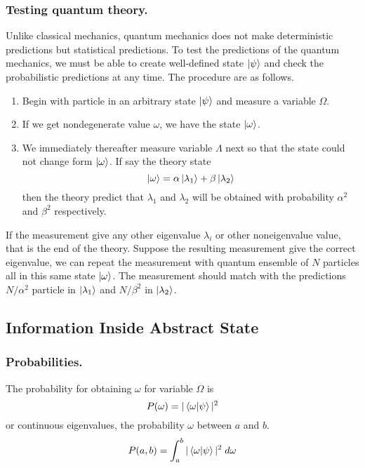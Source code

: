 \documentclass[../../../main.tex]{subfiles}
\begin{document}
\subsubsection{Testing quantum theory.}
Unlike classical mechanics, quantum mechanics does not make deterministic predictions but statistical predictions.
To test the predictions of the quantum mechanics, we must be able to create well-defined state $\ket{\psi}$ and check the probabilistic predictions at any time.
The procedure are as follows.
\begin{enumerate}
    \item Begin with particle in an arbitrary state $\ket{\psi}$ and measure a variable $\Omega$.
    \item If we get nondegenerate value $\omega$, we have the state $\ket{\omega}$.
    \item We immediately thereafter measure variable $\Lambda$ next so that the state could not change form $\ket{\omega}$.
    If say the theory state 
    \begin{equation*}
        \ket{\omega}=\alpha \ket{\lambda_1}+\beta \ket{\lambda_2}
    \end{equation*}
    then the theory predict that $\lambda_1$ and $\lambda_2$ will be obtained with probability $\alpha^2$ and $\beta^2$ respectively.
\end{enumerate}
If the measurement give any other eigenvalue $\lambda_i$ or other noneigenvalue value, that is the end of the theory.
Suppose the resulting measurement give the correct eigenvalue, we can repeat the measurement with quantum ensemble of $N$ particles all in this same state $\ket{\omega}$.
The measurement should match with the predictions $N/\alpha^2$ particle in $\ket{\lambda_1}$ and $N/\beta^2$ in $\ket{\lambda_2}$.

\subsection{Information Inside Abstract State}
\subsubsection{Probabilities.}
The probability for obtaining $\omega$ for variable $\Omega$ is 
\begin{equation*}
    P(\omega)=|\braket{\omega|\psi}|^2
\end{equation*}
or continuous eigenvalues, the probability $\omega$ between $a$ and $b$.
\begin{equation*}
    P(a,b)=\int_{a }^{b }|\braket{\omega|\psi}|^2\;d\omega
\end{equation*}
\end{document}

